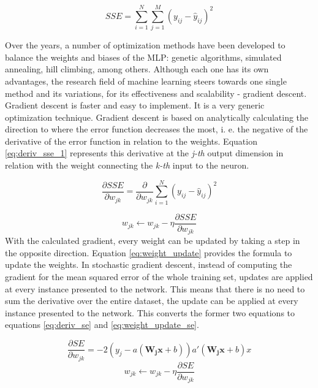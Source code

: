 \documentclass[sigconf]{acmart}
\theoremstyle{plain}
\theoremstyle{remark}
\begin{document}
\begin{equation} \label{eq:sse}
SSE=\sum_{i=1}^{N}\sum_{j=1}^{M}(y_{ij}-\hat{y}_{ij})^2
\end{equation}

Over the years, a number of optimization methods have been developed to balance the weights and biases of the MLP: genetic algorithms, simulated annealing, hill climbing, among others. Although each one has its own advantages, the research field of machine learning steers towards one single method and its variations, for its effectiveness and scalability - gradient descent. Gradient descent is faster and easy to implement. It is a very generic optimization technique. Gradient descent is based on analytically calculating the direction to where the error function decreases the most, i. e. the negative of the derivative of the error function in relation to the weights. Equation \ref{eq:deriv_sse_1} represents this derivative at the \textit{j-th} output dimension in relation with the weight connecting the \textit{k-th} input to the neuron.

 \begin{equation} \label{eq:deriv_sse_1}
\frac{\partial SSE}{\partial w_{jk}}=\frac{\partial}{\partial w_{jk}}\sum_{i=1}^{N}(y_{ij}-\hat{y}_{ij})^2
\end{equation}

\begin{equation} \label{eq:weight_update}
w_{jk}\leftarrow w_{jk}-\eta\frac{\partial SSE}{\partial w_{jk}}
\end{equation}
With the calculated gradient, every weight can be updated by taking a step in the opposite direction. Equation \ref{eq:weight_update} provides the formula to update the weights. In stochastic gradient descent, instead of computing the gradient for the mean squared error of the whole training set, updates are applied at every instance presented to the network. This means that there is no need to sum the derivative over the entire dataset, the update can be applied at every instance presented to the network. This converts the former two equations to equations \ref{eq:deriv_se} and \ref{eq:weight_update_se}.

 \begin{equation} \label{eq:deriv_se}
\frac{\partial SE}{\partial w_{jk}}=-2(y_j-a(\mathbf{W_jx}+b))a'(\mathbf{W_jx}+b)x
\end{equation}
\begin{equation} \label{eq:weight_update_se}
w_{jk}\leftarrow w_{jk}-\eta\frac{\partial SE}{\partial w_{jk}}
\end{equation}
\end{document}
